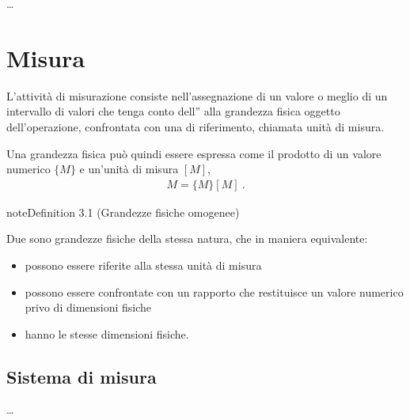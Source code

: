 \documentclass[letterpaper,10pt,italian]{jupyterBook}
\begin{document}
\sphinxAtStartPar
…

\sphinxstepscope


\chapter{Misura}
\label{\detokenize{ch/intro/measurements:misura}}\label{\detokenize{ch/intro/measurements:physics-hs-intro-measurements}}\label{\detokenize{ch/intro/measurements::doc}}
\sphinxAtStartPar
L’attività di misurazione consiste nell’assegnazione di un valore \sphinxhyphen{} o meglio di un intervallo di valori che tenga conto dell” \sphinxhyphen{} alla grandezza fisica oggetto dell’operazione, confrontata con una {\hyperref[\detokenize{ch/intro/measurements:physics-hs-intro-measurements-homogeneous}]{}} di riferimento, chiamata unità di misura.

\sphinxAtStartPar
Una grandezza fisica può quindi essere espressa come il prodotto di un valore numerico \(\{ M \}\) e un’unità di misura \([M]\),
\begin{equation*}
\begin{split}M = \{ M \} [ M ] \ .\end{split}
\end{equation*}\label{ch/intro/measurements:def-dimensions-homonegneous}
\begin{sphinxadmonition}{note}{Definition 3.1 (Grandezze fisiche omogenee)}



\sphinxAtStartPar
Due  sono grandezze fisiche della stessa natura, che \sphinxhyphen{} in maniera equivalente:
\begin{itemize}
\item {} 
\sphinxAtStartPar
possono essere riferite alla stessa unità di misura

\item {} 
\sphinxAtStartPar
possono essere confrontate con un rapporto che restituisce un valore numerico \sphinxhyphen{} privo di dimensioni fisiche

\item {} 
\sphinxAtStartPar
hanno le stesse dimensioni fisiche.

\end{itemize}
\end{sphinxadmonition}


\section{Sistema di misura}
\label{\detokenize{ch/intro/measurements:sistema-di-misura}}\label{\detokenize{ch/intro/measurements:physics-hs-intro-measurements-unit-system}}
\sphinxAtStartPar
…
\end{document}
